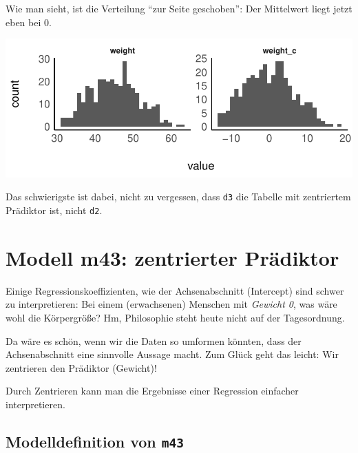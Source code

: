 \documentclass[
  a4paper,
  DIV=11]{scrreprt}
\theoremstyle{definition}
\theoremstyle{remark}
\begin{document}
Wie man sieht, ist die Verteilung ``zur Seite geschoben'': Der
Mittelwert liegt jetzt eben bei 0.

\includegraphics{./lineare-modelle_files/figure-pdf/Post-Regression-9-1.pdf}

Das schwierigste ist dabei, nicht zu vergessen, dass \texttt{d3} die
Tabelle mit zentriertem Prädiktor ist, nicht \texttt{d2}.

\hypertarget{modell-m43-zentrierter-pruxe4diktor}{%
\section{Modell m43: zentrierter
Prädiktor}\label{modell-m43-zentrierter-pruxe4diktor}}

Einige Regressionskoeffizienten, wie der Achsenabschnitt (Intercept)
sind schwer zu interpretieren: Bei einem (erwachsenen) Menschen mit
\emph{Gewicht 0}, was wäre wohl die Körpergröße? Hm, Philosophie steht
heute nicht auf der Tagesordnung.

Da wäre es schön, wenn wir die Daten so umformen könnten, dass der
Achsenabschnitt eine sinnvolle Aussage macht. Zum Glück geht das leicht:
Wir zentrieren den Prädiktor (Gewicht)!

\begin{tcolorbox}[enhanced jigsaw, title=\textcolor{quarto-callout-important-color}{\faExclamation}\hspace{0.5em}{Wichtig}, bottomtitle=1mm, bottomrule=.15mm, titlerule=0mm, colbacktitle=quarto-callout-important-color!10!white, colframe=quarto-callout-important-color-frame, leftrule=.75mm, left=2mm, toprule=.15mm, colback=white, arc=.35mm, breakable, toptitle=1mm, opacityback=0, rightrule=.15mm, coltitle=black, opacitybacktitle=0.6]

Durch Zentrieren kann man die Ergebnisse einer Regression einfacher
interpretieren.

\end{tcolorbox}

\hypertarget{modelldefinition-von-m43}{%
\subsection{\texorpdfstring{Modelldefinition von
\texttt{m43}}{Modelldefinition von m43}}\label{modelldefinition-von-m43}}
\end{document}
